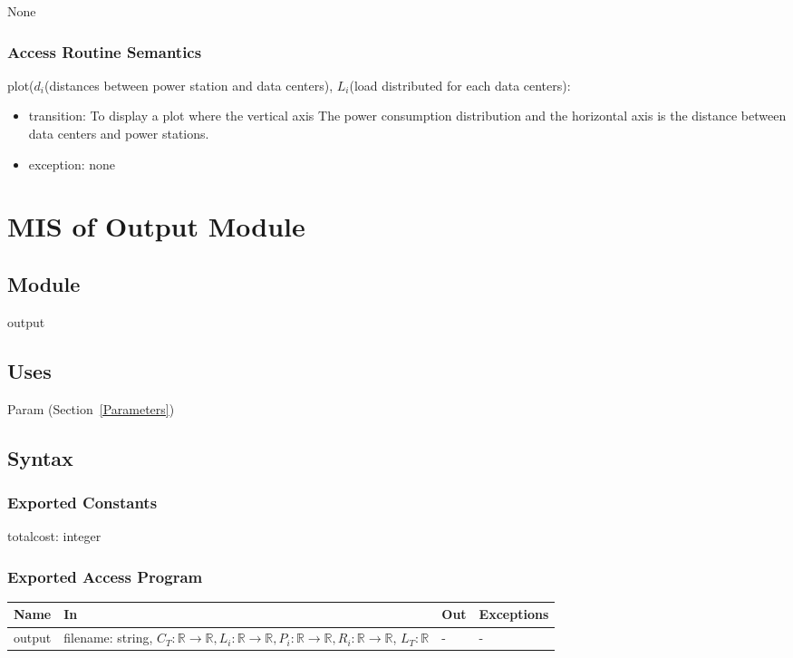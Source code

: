 \documentclass[12pt, titlepage]{article}
\begin{document}
None

\subsubsection{Access Routine Semantics}

\noindent plot($d_i$(distances between power station and data centers), $L_i$(load distributed for each data centers):
\begin{itemize}
\item transition: To display a plot where the vertical axis
  The power consumption distribution and the horizontal axis is the distance between data centers and power stations.  
\item exception: none
\end{itemize}

\newpage

\section{MIS of Output Module} \label{Output}

\subsection{Module}

output

\subsection{Uses}

Param (Section~\ref{Parameters})

\subsection{Syntax}

\subsubsection{Exported Constants}

totalcost: integer

\subsubsection{Exported Access Program}

\begin{center}
\begin{tabular}{p{3cm} p{7cm} p{2cm} p{2cm}}
\hline
\textbf{Name} & \textbf{In} & \textbf{Out} & \textbf{Exceptions} \\
\hline
output & filename: string, $C_T:\mathbb{R} \rightarrow \mathbb{R},
                 L_i:\mathbb{R} \rightarrow \mathbb{R},
                 P_i:\mathbb{R} \rightarrow \mathbb{R},
       R_i:\mathbb{R} \rightarrow \mathbb{R}$, $L_T: \mathbb{R}$ & - & - \\
\hline
\end{tabular}
\end{center}
\end{document}
